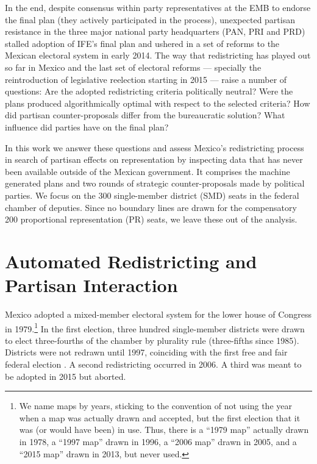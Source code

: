 \documentclass[letter,12pt]{article}
\begin{document}


In the end, despite consensus within party representatives at the EMB to endorse the final plan (they actively participated in the process), unexpected partisan resistance in the three major national party headquarters (PAN, PRI and PRD) stalled adoption of IFE's final plan and ushered in a set of reforms to the Mexican electoral system in early 2014. The way that redistricting has played out so far in Mexico and the last set of electoral reforms --- specially the reintroduction of legislative reelection starting in 2015 --- raise a number of questions: Are the adopted redistricting criteria politically neutral? Were the plans produced algorithmically optimal with respect to the selected criteria? How did partisan counter-proposals differ from the bureaucratic solution? What influence did parties have on the final plan? 

In this work we answer these questions and assess Mexico's redistricting process in search of partisan effects on representation by inspecting data that has never been available outside of the Mexican government. It comprises the machine generated plans and two rounds of strategic counter-proposals made by political parties. We focus on the 300 single-member district (SMD) seats in the federal chamber of deputies. Since no boundary lines are drawn for the compensatory 200 proportional representation (PR) seats, we leave these out of the analysis. 

\section{Automated Redistricting and Partisan Interaction}

Mexico adopted a mixed-member electoral system for the lower house of Congress in 1979.\footnote{We name maps by years, sticking to the convention of not using the year when a map was actually drawn and accepted, but the first election that it was (or would have been) in use. Thus, there is a ``1979 map'' actually drawn in 1978, a ``1997 map'' drawn in 1996, a ``2006 map'' drawn in 2005, and a ``2015 map'' drawn in 2013, but never used.} In the first election, three hundred single-member districts were drawn to elect three-fourths of the chamber by plurality rule (three-fifths since 1985). Districts were not redrawn until 1997, coinciding with the first free and fair federal election \citep{lujambio.vives.2008,trelles.mtz.tesisItam.2007}. A second redistricting occurred in 2006. A third was meant to be adopted in 2015 but aborted. 
\end{document}
